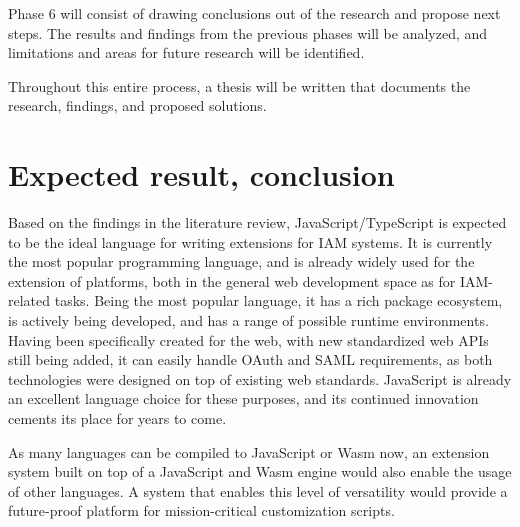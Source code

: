 Phase 6 will consist of drawing conclusions out of the research and propose next steps. The results and findings from the previous phases will be analyzed, and limitations and areas for future research will be identified.

Throughout this entire process, a thesis will be written that documents the research, findings, and proposed solutions.


\section{Expected result, conclusion}%
\label{sec:expected_results}

Based on the findings in the literature review, JavaScript/TypeScript is expected to be the ideal language for writing extensions for IAM systems. It is currently the most popular programming language, and is already widely used for the extension of platforms, both in the general web development space as for IAM-related tasks. Being the most popular language, it has a rich package ecosystem, is actively being developed, and has a range of possible runtime environments. Having been specifically created for the web, with new standardized web APIs still being added, it can easily handle OAuth and SAML requirements, as both technologies were designed on top of existing web standards. JavaScript is already an excellent language choice for these purposes, and its continued innovation cements its place for years to come.

As many languages can be compiled to JavaScript or Wasm now, an extension system built on top of a JavaScript and Wasm engine would also enable the usage of other languages. A system that enables this level of versatility would provide a future-proof platform for mission-critical customization scripts.

